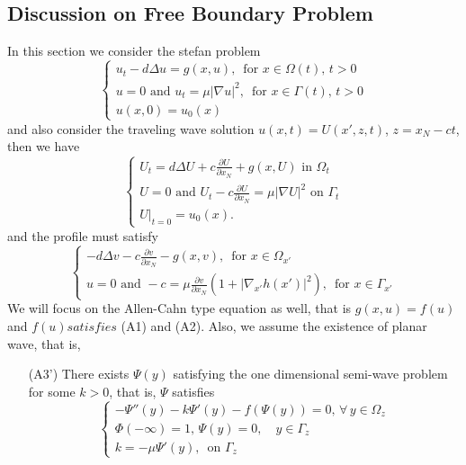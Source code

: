 \documentclass[12pt, a4paper]{article}
\numberwithin{equation}{section}
\newcommand{\pd}[2]{\frac{\partial #1}{\partial #2}}
\begin{document}
\begin{CJK}{UTF8}{bkai}
\section{Discussion on Free Boundary Problem}
	In this section we consider the stefan problem
\begin{equation}\label{iden3.1}
\begin{cases}
	u_t-d\Delta u=g(x,u),\,\mbox{ for }x\in\Omega(t),\,t>0\\
	u=0\mbox{ and }u_t=\mu|\nabla u|^2,\,\mbox{ for }x\in\Gamma(t),\,t>0\\
	u(x,0)=u_0(x)
\end{cases}
\end{equation}
and also consider the traveling wave solution $u(x,t)=U(x',z,t)$, $z=x_N-ct$, then we have
\begin{equation}\label{iden3.2}
\begin{cases}
	U_t=d\Delta U+c\pd{U}{x_N}+g(x,U)\mbox{ in }\Omega_t\\
	U=0\mbox{ and }U_t-c\pd{U}{x_N}=\mu|\nabla U|^2\mbox{ on }\Gamma_t\\
	U|_{t=0}=u_0(x).
\end{cases}
\end{equation}
and the profile must satisfy
\begin{equation}\label{iden3.3}
\begin{cases}
	-d\Delta v-c\pd{v}{x_N}-g(x,v),\,\mbox{ for }x\in\Omega_{x'}\\
	u=0\mbox{ and }-c=\mu\pd{v}{x_N}(1+|\nabla_{x'}h(x')|^2),\,\mbox{ for }x\in\Gamma_{x'}
\end{cases}
\end{equation}
	We will focus on the Allen-Cahn type equation as well, that is $g(x,u)=f(u)$ and $f(u) satisfies$ (A1) and (A2). Also, we assume the existence of planar wave, that is,
\begin{enumerate}
	\item[(A3')] There exists $\Psi(y)$ satisfying the one dimensional semi-wave problem for some $k>0$, that is, $\Psi$ satisfies
	\begin{equation}
	\begin{cases}
		-\Psi''(y)-k\Psi'(y)-f(\Psi(y))=0,\,\forall\,y\in\Omega_{z}\\
		\Phi(-\infty)=1,\,\Psi(y)=0,\quad y\in\Gamma_z\\
		k=-\mu\Psi'(y),\,\mbox{ on }\Gamma_z
	\end{cases}
	\end{equation}


\end{enumerate}
\end{CJK}
\end{document}
